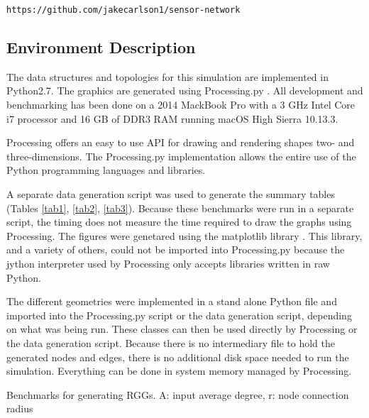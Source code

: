 \documentclass{article}
\begin{document}
    \begin{center}
        \texttt{https://github.com/jakecarlson1/sensor-network}
    \end{center}

    \subsection{Environment Description}
    The data structures and topologies for this simulation are implemented in Python2.7. The graphics are generated using Processing.py \cite{processing}. All development and benchmarking has been done on a 2014 MackBook Pro with a 3 GHz Intel Core i7 processor and 16 GB of DDR3 RAM running macOS High Sierra 10.13.3.
    \par
    Processing offers an easy to use API for drawing and rendering shapes two- and three-dimensions. The Processing.py implementation allows the entire use of the Python programming languages and libraries.
    \par
    A separate data generation script was used to generate the summary tables (Tables \ref{tab1}, \ref{tab2}, \ref{tab3}). Because these benchmarks were run in a separate script, the timing does not measure the time required to draw the graphs using Processing. The figures were genetared using the matplotlib library \cite{matplotlib}. This library, and a variety of others, could not be imported into Processing.py because the jython interpreter used by Processing only accepts libraries written in raw Python.
    \par
    The different geometries were implemented in a stand alone Python file and imported into the Processing.py script or the data generation script, depending on what was being run. These classes can then be used directly by Processing or the data generation script. Because there is no intermediary file to hold the generated nodes and edges, there is no additional disk space needed to run the simulation. Everything can be done in system memory managed by Processing.

    \begin{center}
        \begin{table}[h]
            \centering
            \begin{adjustbox}{width=1\textwidth}
            \end{adjustbox}
            \caption{Benchmarks for generating RGGs. A: input average degree, r: node connection radius}
            \label{tab1}
        \end{table}
    \end{center}
\end{document}
